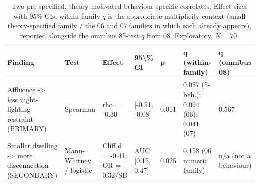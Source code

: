 \begin{table}
\caption{Two pre-specified, theory-motivated behaviour-specific correlates. Effect sizes with 95\% CIs; within-family $q$ is the appropriate multiplicity context (small theory-specified family / the 06 and 07 families in which each already appears), reported alongside the omnibus 85-test $q$ from 08. Exploratory, $N=70$.}
\label{tab:targeted}
\begin{tabular}{lllllll}
\toprule
Finding & Test & Effect & 95\textbackslash \% CI & p & q (within-family) & q (omnibus 08) \\
\midrule
Affluence -> less night-lighting restraint (PRIMARY) & Spearman & rho = -0.30 & [-0.51, -0.08] & 0.011 & 0.057 (5-beh.); 0.094 (06); 0.041 (07) & 0.567 \\
Smaller dwelling -> more disconnection (SECONDARY) & Mann-Whitney / logistic & Cliff d = -0.41; OR = 0.32/SD & AUC [0.15, 0.47] & 0.025 & 0.158 (06 numeric family) & n/a (not a behaviour) \\
\bottomrule
\end{tabular}
\end{table}
